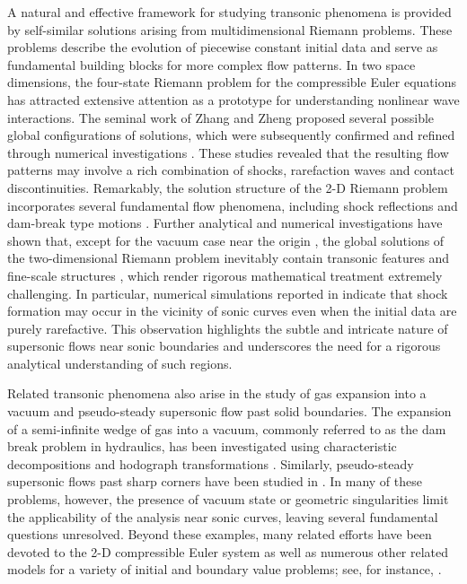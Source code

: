 \documentclass[3p,11pt]{elsarticle}
\numberwithin{equation}{section}
\begin{document}
A natural and effective framework for studying transonic phenomena is provided by self-similar solutions arising from multidimensional Riemann problems. These problems describe the evolution of piecewise constant initial data and serve as fundamental building blocks for more complex flow patterns. In two space dimensions, the four-state Riemann problem for the compressible Euler equations has attracted extensive attention as a prototype for understanding nonlinear wave interactions. The seminal work of Zhang and Zheng \cite{conjecture1990} proposed several possible global configurations of solutions, which were subsequently confirmed and refined through numerical investigations \cite{pdlax, Schulz1993, Glimm2008, Alexander2017}. These studies revealed that the resulting flow patterns may involve a rich combination of shocks, rarefaction waves and contact discontinuities. Remarkably, the solution structure of the 2-D Riemann problem incorporates several fundamental flow phenomena, including shock reflections and dam-break type motions \cite{Jli2009}. Further analytical and numerical investigations have shown that, except for the vacuum case near the origin \cite{Jli2010}, the global solutions of the two-dimensional Riemann problem inevitably contain transonic features and fine-scale structures \cite{Jli1998, yuxizhang2001}, which render rigorous mathematical treatment extremely challenging. In particular, numerical simulations reported in \cite{Glimm2008} indicate that shock formation may occur in the vicinity of sonic curves even when the initial data are purely rarefactive. This observation highlights the subtle and intricate nature of supersonic flows near sonic boundaries and underscores the need for a rigorous analytical understanding of such regions.

Related transonic phenomena also arise in the study of gas expansion into a vacuum and pseudo-steady supersonic flow past solid boundaries. The expansion of a semi-infinite wedge of gas into a vacuum, commonly referred to as the dam break problem in hydraulics, has been investigated using characteristic decompositions and hodograph transformations \cite{simplewave2006, gasexpansion2001, interaction2009, chdecomposition, LaiGeng2019}. Similarly, pseudo-steady supersonic flows past sharp corners have been studied in \cite{wsheng2018, glai2021, Rahul2}. In many of these problems, however, the presence of vacuum state or geometric singularities limit the applicability of the analysis near sonic curves, leaving several fundamental questions unresolved. Beyond these examples, many related efforts have been devoted to the 2-D compressible Euler system as well as numerous other related models for a variety of initial and boundary value problems; see, for instance, \cite{Rahul3, cshen, Pandey2, Pandey1}.
\end{document}

